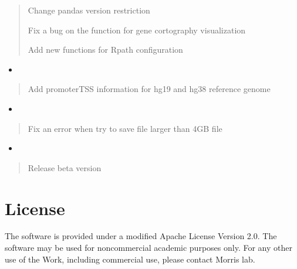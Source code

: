 \documentclass[letterpaper,10pt,english]{sphinxmanual}
\begin{document}
\begin{quote}

\sphinxtitleref{\sphinxhyphen{}} Change pandas version restriction

\sphinxtitleref{\sphinxhyphen{}} Fix a bug on the function for gene cortography visualization

\sphinxtitleref{\sphinxhyphen{}} Add new functions for R\sphinxhyphen{}path configuration
\end{quote}
\begin{itemize}
\item {} 

\end{itemize}
\begin{quote}

\sphinxtitleref{\sphinxhyphen{}} Add promoter\sphinxhyphen{}TSS information for hg19 and hg38 reference genome
\end{quote}
\begin{itemize}
\item {} 

\end{itemize}
\begin{quote}

\sphinxtitleref{\sphinxhyphen{}} Fix an error when try to save file larger than 4GB file
\end{quote}
\begin{itemize}
\item {} 

\end{itemize}
\begin{quote}

\sphinxtitleref{\sphinxhyphen{}} Release beta version
\end{quote}


\section{License}
\label{\detokenize{license/index:license}}\label{\detokenize{license/index:id1}}\label{\detokenize{license/index::doc}}
The software is provided under a modified Apache License Version 2.0.
The software may be used for non\sphinxhyphen{}commercial academic purposes only.
For any other use of the Work, including commercial use, please contact Morris lab.
\end{document}

